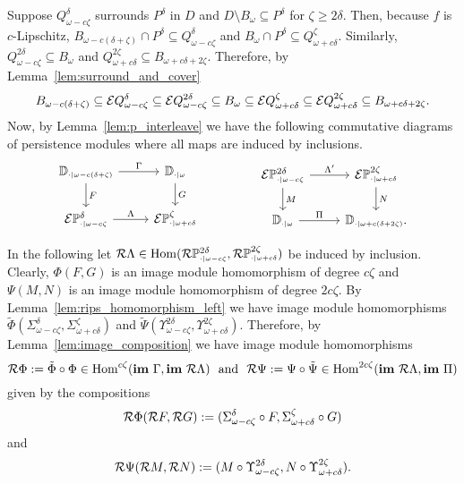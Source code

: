 
Suppose $Q_{\omega-c\zeta}^\delta$ surrounds $P^\delta$ in $D$ and $D\setminus B_\omega\subseteq P^\delta$ for $\zeta\geq 2\delta$.
Then, because $f$ is $c$-Lipschitz, $B_{\omega-c(\delta+\zeta)}\cap P^\delta\subseteq Q_{\omega-c\zeta}^\delta$ and $B_\omega\cap P^\delta\subseteq Q_{\omega+c\delta}^\zeta$.
Similarly, $Q_{\omega-c\zeta}^{2\delta}\subseteq B_\omega$ and $Q_{\omega+c\delta}^{2\zeta}\subseteq B_{\omega+c{\delta+2\zeta}}$.
Therefore, by Lemma~\ref{lem:surround_and_cover}
\[ B_{\omega-c(\delta+\zeta)}\subseteq \mathcal{E} Q_{\omega-c\zeta}^\delta\subseteq\mathcal{E} Q_{\omega-c\zeta}^{2\delta}\subseteq B_\omega
  \subseteq \mathcal{E} Q_{\omega+c\delta}^\zeta\subseteq \mathcal{E} Q_{\omega+c\delta}^{2\zeta}\subseteq B_{\omega+c{\delta+2\zeta}}.\]
%
Now, by Lemma~\ref{lem:p_interleave} we have the following commutative diagrams of persistence modules where all maps are induced by inclusions.
\[\begin{tikzcd}
    \DD{\omega-c(\delta+\zeta)} \arrow{r}{\Gamma}\arrow{d}{F} &
    \DD{\omega} \arrow{d}{G}\\
    \E\PP{\omega-c\zeta}{\delta}\arrow{r}{\Lambda} &
    \E\PP{\omega+c\delta}{\zeta}
  \end{tikzcd}\hspace{10ex}
  \begin{tikzcd}
    \E\PP{\omega-c\zeta}{2\delta} \arrow{r}{\Lambda'}\arrow{d}{M} &
    \E\PP{\omega+c\delta}{2\zeta}\arrow{d}{N}\\
    \DD{\omega} \arrow{r}{\Pi} &
    \DD{\omega+c(\delta+2\zeta)}.
  \end{tikzcd}\]

In the following let $\mathcal{R}\Lambda\in\mathrm{Hom}(\mathcal{R}\mathbb{P}_{\scriptscriptstyle \cdot\mid \omega-c\zeta}^{2\delta},\mathcal{R}\mathbb{P}_{\scriptscriptstyle \cdot\mid \omega+c\delta}^{2\zeta})$ be induced by inclusion.
Clearly, $\Phi(F, G)$ is an image module homomorphism of degree $c\zeta$ and $\Psi(M, N)$ is an image module homomorphism of degree $2c\zeta$.
By Lemma~\ref{lem:rips_homomorphism_left} we have image module homomorphisms $\tilde{\Phi}(\Sigma_{\omega-c\zeta}^\delta, \Sigma_{\omega+c\delta}^\zeta)$ and $\tilde{\Psi}(\Upsilon_{\omega-c\zeta}^{2\delta}, \Upsilon_{\omega+c\delta}^{2\zeta})$.
Therefore, by Lemma~\ref{lem:image_composition} we have image module homomorphisms
\[ \mathcal{R}\Phi := \tilde{\Phi}\circ\Phi\in\mathrm{Hom}^{c\zeta}(\mathbf{im}~\Gamma,\mathbf{im}~\mathcal{R}\Lambda)\ \text{ and }\ \mathcal{R}\Psi :=\Psi\circ\tilde{\Psi}\in\mathrm{Hom}^{2c\zeta}(\mathbf{im}~\mathcal{R}\Lambda, \mathbf{im}~\Pi)\] given by the compositions
\[ \mathcal{R}\Phi(\mathcal{R} F, \mathcal{R} G) := (\Sigma_{\omega-c\zeta}^\delta\circ F, \Sigma_{\omega+c\delta}^\zeta\circ G)\]
and
\[ \mathcal{R}\Psi(\mathcal{R} M, \mathcal{R} N) := (M\circ \Upsilon_{\omega-c\zeta}^{2\delta}, N\circ\Upsilon_{\omega+c\delta}^{2\zeta}).\]


